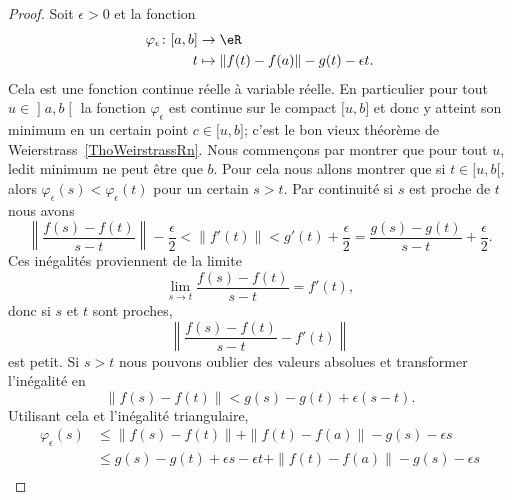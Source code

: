 \begin{proof}
	Soit \( \epsilon>0\) et la fonction
	\begin{equation}
		\begin{aligned}
			\varphi_{\epsilon}\colon \mathopen[ a , b \mathclose] & \to \eR                                  \\
			t                                                     & \mapsto \| f(t)-f(a) \|-g(t)-\epsilon t.
		\end{aligned}
	\end{equation}
	Cela est une fonction continue réelle à variable réelle. En particulier pour tout \( u\in\mathopen] a , b \mathclose[\) la fonction \( \varphi_{\epsilon}\) est continue sur le compact \( \mathopen[ u , b \mathclose]\) et donc y atteint son minimum en un certain point \( c\in\mathopen[ u , b \mathclose]\); c'est le bon vieux théorème de Weierstrass~\ref{ThoWeirstrassRn}. Nous commençons par montrer que pour tout \( u\), ledit minimum ne peut être que \( b\). Pour cela nous allons montrer que si \( t\in\mathopen[ u , b [\), alors \( \varphi_{\epsilon}(s)<\varphi_{\epsilon}(t)\) pour un certain \( s>t\). Par continuité si \( s\) est proche de \( t\) nous avons
			\begin{equation}
				\left\|  \frac{ f(s)-f(t) }{ s-t }  \right\|-\frac{ \epsilon }{2}<\| f'(t) \|<g'(t)+\frac{ \epsilon }{2}=\frac{ g(s)-g(t) }{ s-t }+\frac{ \epsilon }{2}.
			\end{equation}
			Ces inégalités proviennent de la limite
			\begin{equation}
				\lim_{s\to t} \frac{ f(s)-f(t) }{ s-t }=f'(t),
			\end{equation}
			donc si \( s\) et \( t\) sont proches,
			\begin{equation}
				\left\| \frac{ f(s)-f(t) }{ s-t }-f'(t) \right\|
			\end{equation}
			est petit. Si \( s>t\) nous pouvons oublier des valeurs absolues et transformer l'inégalité en
			\begin{equation}
				\| f(s)-f(t) \|<g(s)-g(t)+\epsilon(s-t).
			\end{equation}
			Utilisant cela et l'inégalité triangulaire,
			\begin{subequations}
				\begin{align}
					\varphi_{\epsilon}(s) & \leq\| f(s)-f(t) \|+\| f(t)-f(a) \|-g(s)-\epsilon s                  \\
					                      & \leq g(s)-g(t)+\epsilon s-\epsilon t+\| f(t)-f(a) \|-g(s)-\epsilon s \\

\end{align}
\end{subequations}
\end{proof}
